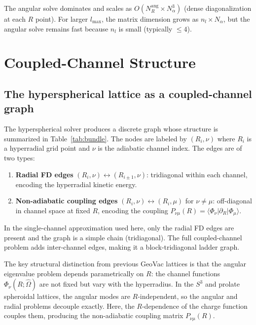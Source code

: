 \documentclass[aps,pra,twocolumn,superscriptaddress,longbibliography]{revtex4-2}
\begin{document}
The angular solve dominates and scales as $O(N_R^{\mathrm{ang}}
\times N_\alpha^3)$ (dense diagonalization at each $R$ point).  For
larger $l_{\max}$, the matrix dimension grows as $n_l \times
N_\alpha$, but the angular solve remains fast because $n_l$ is small
(typically $\leq 4$).


\section{Coupled-Channel Structure}
\label{sec:fiber_bundle}

\subsection{The hyperspherical lattice as a coupled-channel graph}

The hyperspherical solver produces a discrete graph whose structure
is summarized in Table~\ref{tab:bundle}.  The nodes are labeled by
$(R_i, \nu)$ where $R_i$ is a hyperradial grid point and $\nu$ is the
adiabatic channel index.  The edges are of two types:
\begin{enumerate}
  \item \textbf{Radial FD edges} $(R_i, \nu) \leftrightarrow
    (R_{i\pm 1}, \nu)$: tridiagonal within each channel,
    encoding the hyperradial kinetic energy.
  \item \textbf{Non-adiabatic coupling edges}
    $(R_i, \nu) \leftrightarrow (R_i, \mu)$ for $\nu \neq \mu$:
    off-diagonal in channel space at fixed $R$, encoding the
    coupling $P_{\nu\mu}(R) = \langle\Phi_\nu|\partial_R|\Phi_\mu
    \rangle$.
\end{enumerate}

In the single-channel approximation used here, only the radial FD
edges are present and the graph is a simple chain (tridiagonal).
The full coupled-channel problem adds inter-channel edges, making it
a block-tridiagonal ladder graph.

The key structural distinction from previous GeoVac lattices is that the
angular eigenvalue problem depends parametrically on $R$: the channel
functions $\Phi_\nu(R; \hat\Omega)$ are not fixed but vary with the
hyperradius.  In the $S^3$ and prolate spheroidal lattices, the angular
modes are $R$-independent, so the angular and radial problems decouple
exactly.  Here, the $R$-dependence of the charge function couples
them, producing the non-adiabatic coupling matrix $P_{\nu\mu}(R)$.
\end{document}

